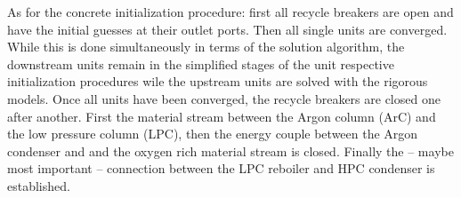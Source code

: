         As for the concrete initialization procedure: first all recycle breakers are open and have the initial guesses at their outlet
        ports. Then all single units are converged. While this is done simultaneously in terms of the solution algorithm, the downstream
        units remain in the simplified stages of the unit respective initialization procedures wile the upstream units are solved with the
        rigorous models. Once all units have been converged, the recycle breakers are closed one after another. First the material stream
        between the Argon column (ArC) and the low pressure column (LPC), then the energy couple between the Argon condenser and
        and the oxygen rich material stream is closed. Finally the -- maybe most important -- connection between the LPC reboiler
        and HPC condenser is established.
